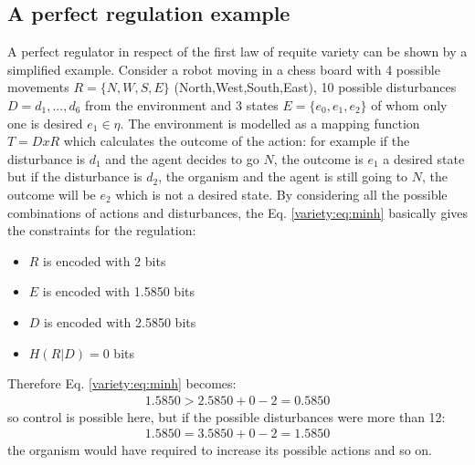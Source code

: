 \subsection{A perfect regulation example}
A perfect regulator in respect of the first law of requite variety can be shown
by a simplified example.
Consider a robot moving in a chess board with 4 possible movements
$R=\{N, W, S, E \}$ (North,West,South,East), 10 possible disturbances $D={d_1,...,d_6}$
from the environment and 3 states $E=\{ e_0,e_1,e_2\}$ of whom only one is desired $e_1 \in \eta$.
The environment is modelled as a mapping function $T=D x R$ which calculates the
 outcome of the action: for example if the disturbance is $d_1$ and the agent
decides to go $N$, the outcome is $e_1$ a desired state but if the disturbance is $d_2$,
the organism and the agent is still going to $N$, the outcome will be $e_2$ which is not
a desired state.
By considering all the possible combinations of actions and disturbances, the Eq. \ref{variety:eq:minh}
basically gives the constraints for the regulation:
\begin{itemize}
 \item $R$ is encoded with 2 bits
 \item $E$ is encoded with 1.5850 bits
 \item $D$ is encoded with 2.5850 bits
 \item $H(R|D)=0$ bits
\end{itemize}
Therefore Eq. \ref{variety:eq:minh} becomes:
\begin{eqnarray}
1.5850 > 2.5850+0-2 = 0.5850
\end{eqnarray}
so control is possible here, but if the possible disturbances were more than 12:
\begin{eqnarray}
1.5850 = 3.5850 +0-2 = 1.5850
\end{eqnarray}
the organism would have required to increase its possible actions and so on.
